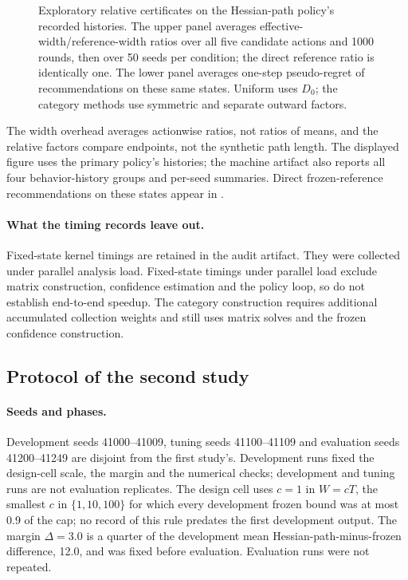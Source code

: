 \begin{figure}[p]
  \centering
  
  \caption{Exploratory relative certificates on the Hessian-path policy's recorded histories.
  The upper panel averages effective-width/reference-width ratios over all
  five candidate actions and 1000 rounds, then over 50 seeds per condition;
  the direct reference ratio is identically one.  The lower panel averages
  one-step pseudo-regret of recommendations on these same states.  Uniform
  uses $D_0$; the category methods use symmetric and separate outward factors.
}
  \label{fig:transport-followup-relative-audit}
\end{figure}

The width overhead averages actionwise ratios, not ratios of means, and the
relative factors compare endpoints, not the synthetic path length.
The displayed figure uses the primary policy's histories; the machine
artifact also reports all four behavior-history groups and per-seed summaries.
Direct frozen-reference recommendations on these states appear in
.

\paragraph{What the timing records leave out.}
Fixed-state kernel timings are retained in the audit artifact.  They were collected under parallel analysis load.
Fixed-state timings under parallel load exclude matrix construction, confidence
estimation and the policy loop, so do not establish end-to-end speedup.  The category construction requires additional
accumulated collection weights and still uses matrix solves and the frozen
confidence construction.

\subsection{Protocol of the second study}
\label{app:transport-v3}

\paragraph{Seeds and phases.}
Development seeds 41000--41009, tuning seeds 41100--41109 and evaluation
seeds 41200--41249 are disjoint from the first study's. Development runs fixed
the design-cell scale, the margin and the numerical checks; development and
tuning runs are not evaluation replicates. The design cell uses $c=1$ in
$W=cT$, the smallest $c$ in $\{1,10,100\}$ for which every development frozen
bound was at most 0.9 of the cap; no record of this rule predates the first
development output. The margin $\Delta=3.0$ is a quarter of the
development mean Hessian-path-minus-frozen difference, 12.0, and was fixed before
evaluation. Evaluation runs were not repeated.

